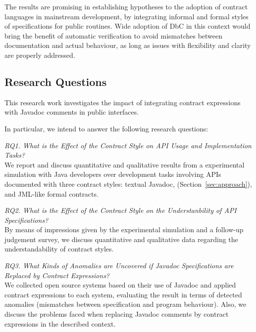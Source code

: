 The results are promising in establishing hypotheses to the adoption of contract languages in mainstream development, by integrating informal and formal styles of specifications for public routines.
Wide adoption of DbC in this context would bring the benefit of automatic verification to avoid mismatches between documentation and actual behaviour, as long as issues with flexibility and clarity are properly addressed. 


\subsection{Research Questions}
\label{sec:researchQuestions}

This research work investigates the impact of integrating contract expressions with Javadoc comments in public interfaces. 

In particular, we intend to answer the following research questions:  

\noindent\emph{RQ1. What is the Effect of the Contract Style on API Usage and Implementation Tasks?}\\
We report and discuss quantitative and qualitative results from a experimental simulation with Java developers over development tasks involving APIs documented with three contract styles: textual Javadoc, \contractjdoc{} (Section~\ref{sec:approach}), and JML-like formal contracts. 

\noindent\emph{RQ2. What is the Effect of the Contract Style on the Understanbility of API Specifications?}\\
By means of impressions given by the experimental simulation and a follow-up judgement survey, we discuss quantitative and qualitative data regarding the understandability of contract styles.

\noindent\emph{RQ3. What Kinds of Anomalies are Uncovered if Javadoc Specifications are Replaced by Contract Expressions?}\\
We collected open source systems based on their use of Javadoc and applied contract expressions
to each system, evaluating the result in terms of detected anomalies (mismatches between specification and program behaviour). Also, we discuss the problems faced when replacing Javadoc comments by contract expressions in the described context.
